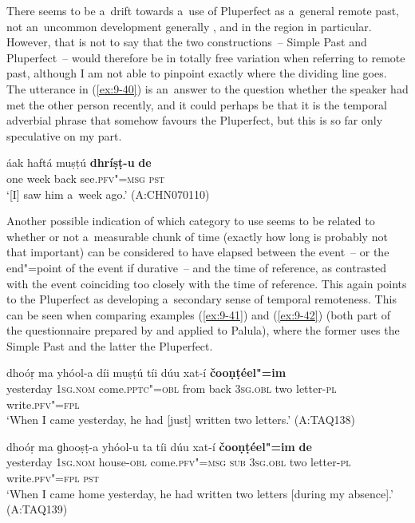 There seems to be a~drift towards a~use of Pluperfect as a~general remote past, not an~uncommon development generally \citep[147]{dahl1985}, and in the region in particular. However, that is not to say that the two constructions~-- Simple Past and Pluperfect~-- would therefore be in totally free variation when referring to remote past, although I am not able to pinpoint exactly where the dividing line goes. The utterance in (\ref{ex:9-40}) is an~answer to the question whether the speaker had met the other person recently, and it could perhaps be that it is the temporal adverbial phrase that somehow favours the Pluperfect, but this is so far only speculative on my part.

\begin{exe}
\ex
\label{ex:9-40}
\gll áak haftá muṣṭú \textbf{dhríṣṭ-u} \textbf{de}  \\
one week back see.\textsc{pfv"=msg} \textsc{pst} \\
\glt `[I] saw him a~week ago.' (A:CHN070110)
\end{exe}

Another possible indication of which category to use seems to be related to whether or not a~measurable chunk of time (exactly how long is probably not that important) can be considered to have elapsed between the event~-- or the end"=point of the event if durative~-- and the time of reference, as contrasted with the event coinciding too closely with the time of reference. This again points to the Pluperfect as developing a~secondary sense of temporal remoteness. This can be seen when comparing examples (\ref{ex:9-41}) and (\ref{ex:9-42}) (both part of the questionnaire prepared by \citet{dahl1985} and applied to Palula), where the former uses the Simple Past and the latter the Pluperfect.

\ea
\label{ex:9-41}
\gll dhoóṛ ma yhóol-a díi muṣṭú tíi dúu xat-í \textbf{čooṇṭéel"=im}\\
yesterday 1\textsc{sg.nom} come.\textsc{pptc"=obl} from back \textsc{3sg.obl} two letter-\textsc{pl} write.\textsc{pfv"=fpl}\\
\glt `When I came yesterday, he had [just] written two letters.' (A:TAQ138)

\ex
\label{ex:9-42}
\gll dhoóṛ ma ɡhooṣṭ-a yhóol-u ta tíi dúu xat-í \textbf{čooṇṭéel"=im} \textbf{de} \\
yesterday 1\textsc{sg.nom} house-\textsc{obl} come.\textsc{pfv"=msg}  \textsc{sub} \textsc{3sg.obl} two letter-\textsc{pl} write.\textsc{pfv"=fpl} \textsc{pst} \\
\glt `When I came home yesterday, he had written two letters [during my absence].' (A:TAQ139)
\z

